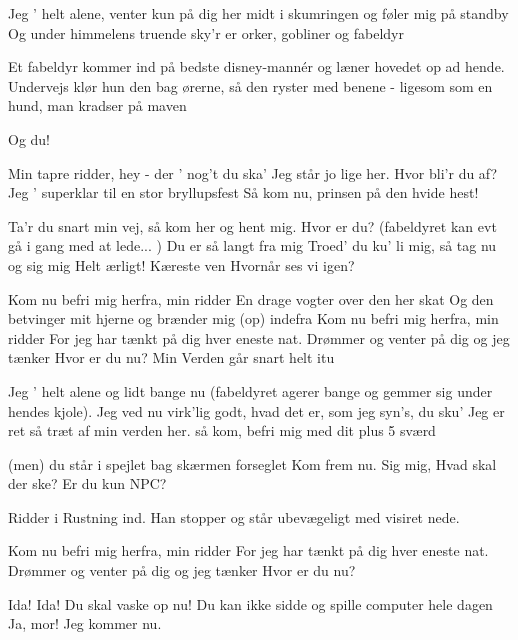 \documentclass[a4paper,11pt]{article}
\begin{document}
 \begin{song}
Jeg ' helt alene, venter kun på dig
her midt i skumringen og føler mig på standby
Og under himmelens truende sky'r
er orker, gobliner og fabeldyr

\scene Et fabeldyr kommer ind på bedste disney-mannér og læner hovedet op ad hende. Undervejs klør hun den bag ørerne, så den ryster med benene - ligesom som en hund, man kradser på maven

 Og du!

Min tapre ridder, hey - der ' nog't du ska'
Jeg står jo lige her. Hvor bli'r du af?
Jeg ' superklar til en stor bryllupsfest
Så kom nu, prinsen på den hvide hest!

Ta'r du snart min vej,
så kom her og hent mig.
Hvor er du? (fabeldyret kan evt gå i gang med at lede... )
Du er så langt fra mig
Troed' du ku' li mig,
så tag nu og sig mig
Helt ærligt!
Kæreste ven
Hvornår ses vi igen?


Kom nu befri mig herfra, min ridder
En drage vogter over den her skat
Og den betvinger
mit hjerne og brænder
mig (op) indefra
Kom nu befri mig herfra, min ridder
For jeg har tænkt på dig hver eneste nat.
Drømmer og venter
på dig og jeg tænker
Hvor er du nu?
Min Verden går
snart helt itu

Jeg ' helt alene og lidt bange nu  (fabeldyret agerer bange og gemmer sig under hendes kjole).
Jeg ved nu virk'lig godt, hvad det er, som jeg syn's, du sku'
Jeg er ret så træt af min verden her.
så kom, befri mig med dit plus 5 sværd

(men) du står i spejlet
bag skærmen forseglet
Kom frem nu.
Sig mig, Hvad skal der ske?
Er du kun NPC?

\scene Ridder i Rustning ind. Han stopper og står ubevægeligt med visiret nede.

Kom nu befri mig herfra, min ridder
For jeg har tænkt på dig hver eneste nat.
Drømmer og venter
på dig og jeg tænker
Hvor er du nu?


 Ida! Ida! Du skal vaske op nu! Du kan ikke sidde og spille computer hele dagen
 Ja, mor! Jeg kommer nu.

 \end{song}
\end{document}
